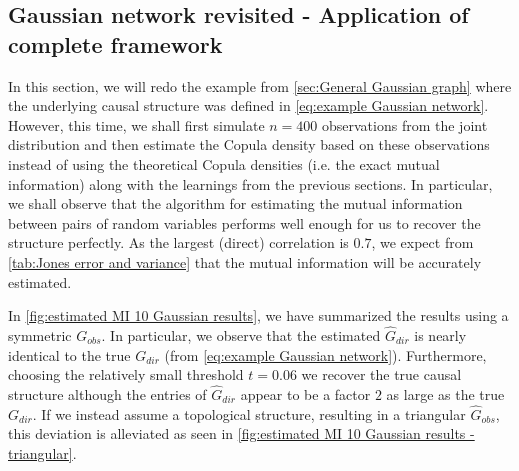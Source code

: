 \documentclass[../Thesis.tex]{subfiles}
\begin{document}



\newpage



\subsection{Gaussian network revisited - Application of complete framework}\label{sec:Gaussian network MI example - computation}
In this section, we will redo the example from \autoref{sec:General Gaussian graph} where the underlying causal structure was defined in \autoref{eq:example Gaussian network}. However, this time, we shall first simulate $n = 400$ observations from the joint distribution and then estimate the Copula density based on these observations instead of using the theoretical Copula densities (i.e. the exact mutual information) along with the learnings from the previous sections. In particular, we shall observe that the algorithm for estimating the mutual information between pairs of random variables performs well enough for us to recover the structure perfectly. As the largest (direct) correlation is $0.7$, we expect from \autoref{tab:Jones error and variance} that the mutual information will be accurately estimated.







In \autoref{fig:estimated MI 10 Gaussian results}, we have summarized the results using a symmetric $G_{obs}$. In particular, we observe that the estimated $\hat{G}_{dir}$ is nearly identical to the true $G_{dir}$ (from \autoref{eq:example Gaussian network}). Furthermore, choosing the relatively small threshold $t = 0.06$ we recover the true causal structure although the entries of $\hat{G}_{dir}$ appear to be a factor $2$ as large as the true $G_{dir}$. If we instead assume a topological structure, resulting in a triangular $\hat{G}_{obs}$, this deviation is alleviated as seen in \autoref{fig:estimated MI 10 Gaussian results - triangular}.
\end{document}
